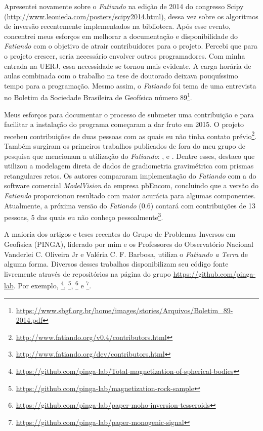 Apresentei novamente sobre o \textit{Fatiando} na edição de 2014 do congresso
Scipy (\url{http://www.leouieda.com/posters/scipy2014.html}), dessa vez sobre
os algoritmos de inversão recentemente implementados na biblioteca.
Após esse evento, concentrei meus esforços em melhorar a documentação e
disponibilidade do \textit{Fatiando} com o objetivo de atrair
contribuidores para o projeto.
Percebi que para o projeto crescer, seria necessário envolver outros
programadores.
Com minha entrada na UERJ, essa necessidade se tornou mais evidente.
A carga horária de aulas combinada com o trabalho na tese de doutorado deixava
pouquíssimo tempo para a programação.
Mesmo assim, o \textit{Fatiando} foi tema de uma entrevista no Boletim da
Sociedade Brasileira de Geofísica número
89\footnote{\url{https://www.sbgf.org.br/home/images/stories/Arquivos/Boletim_89-2014.pdf}}.

Meus esforços para documentar o processo de submeter uma contribuição e para
facilitar a instalação do programa começaram a dar fruto em 2015.
O projeto recebeu contribuições de duas pessoas com as quais eu não tinha
contato prévio\footnote{\url{http://www.fatiando.org/v0.4/contributors.html}}.
Também surgiram os primeiros trabalhos publicados de fora do meu grupo de
pesquisa que mencionam a utilização do \textit{Fatiando}:
\citet{niccoli2015}, \citet{matthews2016} e \citet{bassett2016}.
Dentre esses, destaco \citet{matthews2016} que utilizou a modelagem direta de
dados de gradiometria gravimétrica com prismas retangulares retos.
Os autores compararam implementação do \textit{Fatiando} com a do software
comercial \textit{ModelVision} da empresa pbEncom, concluindo que a versão do
\textit{Fatiando} proporcionou resultado com maior acurácia para algumas
componentes.
Atualmente, a próxima versão do \textit{Fatiando} (0.6) contará com
contribuições de 13 pessoas, 5 das quais eu não conheço
pessoalmente\footnote{\url{http://www.fatiando.org/dev/contributors.html}}.

A maioria dos artigos e teses recentes do Grupo de Problemas Inversos em
Geofísica (PINGA), liderado por mim e os Professores do Observatório Nacional
Vanderlei C. Oliveira Jr e Valéria C. F. Barbosa,
utiliza o \textit{Fatiando a Terra} de alguma forma.
Diversos desses trabalhos disponibilizam seu código fonte livremente através de
repositórios na página do grupo \url{https://github.com/pinga-lab}.
Por exemplo,
\citet{magdir}\footnote{\url{https://github.com/pinga-lab/Total-magnetization-of-spherical-bodies}},
\citet{reis2016}\footnote{\url{https://github.com/pinga-lab/magnetization-rock-sample}},
\citet{moho}\footnote{\url{https://github.com/pinga-lab/paper-moho-inversion-tesseroids}}
e
\citet{monogenic2017}\footnote{\url{https://github.com/pinga-lab/paper-monogenic-signal}}.

